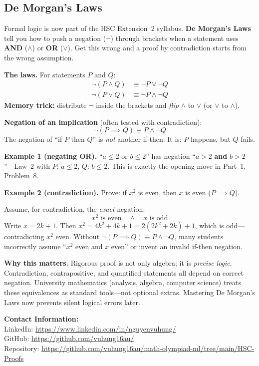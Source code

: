 \documentclass[12pt]{article}
\begin{document}
\subsection{De Morgan's Laws}

Formal logic is now part of the HSC Extension~2 syllabus. \textbf{De Morgan's Laws} tell you how to push a negation ($\neg$) through brackets when a statement uses \textbf{AND} ($\land$) or \textbf{OR} ($\lor$). Get this wrong and a proof by contradiction starts from the wrong assumption.

\medskip
\noindent\textbf{The laws.} For statements $P$ and $Q$:
\begin{align*}
  \neg(P \land Q) &\equiv \neg P \lor \neg Q \\
  \neg(P \lor Q)  &\equiv \neg P \land \neg Q
\end{align*}
\noindent\textbf{Memory trick:} distribute $\neg$ inside the brackets and \emph{flip} $\land$ to $\lor$ (or $\lor$ to $\land$).

\medskip
\noindent\textbf{Negation of an implication} (often tested with contradiction):
\[
  \neg(P \implies Q) \equiv P \land \neg Q
\]
The negation of ``if $P$ then $Q$'' is \emph{not} another if-then. It is: $P$ happens, but $Q$ fails.

\medskip
\noindent\textbf{Example 1 (negating OR).} ``$a \leq 2$ or $b \leq 2$'' has negation ``$a > 2$ \textbf{and} $b > 2$''---Law~2 with $P$: $a \leq 2$, $Q$: $b \leq 2$. This is exactly the opening move in Part~1, Problem~8.

\medskip
\noindent\textbf{Example 2 (contradiction).} Prove: if $x^2$ is even, then $x$ is even ($P \implies Q$).

Assume, for contradiction, the \emph{exact} negation:
\[
  x^2 \text{ is even} \quad \land \quad x \text{ is odd}
\]
Write $x = 2k+1$. Then $x^2 = 4k^2 + 4k + 1 = 2(2k^2 + 2k) + 1$, which is odd---contradicting $x^2$ even. Without $\neg(P \implies Q) \equiv P \land \neg Q$, many students incorrectly assume ``$x^2$ even and $x$ even'' or invent an invalid if-then negation.

\medskip
\noindent\textbf{Why this matters.} Rigorous proof is not only algebra; it is \emph{precise logic}. Contradiction, contrapositive, and quantified statements all depend on correct negation. University mathematics (analysis, algebra, computer science) treats these equivalences as standard tools---not optional extras. Mastering De Morgan's Laws now prevents silent logical errors later.

\vspace{2em}
\noindent\textbf{Contact Information:}\\[0.5em]
LinkedIn: \href{https://www.linkedin.com/in/nguyenvuhung/}{https://www.linkedin.com/in/nguyenvuhung/}\\[0.3em]
GitHub: \href{https://github.com/vuhung16au/}{https://github.com/vuhung16au/}\\[0.3em]
Repository: \href{https://github.com/vuhung16au/math-olympiad-ml/tree/main/HSC-Proofs}{https://github.com/vuhung16au/math-olympiad-ml/tree/main/HSC-Proofs}
\end{document}
